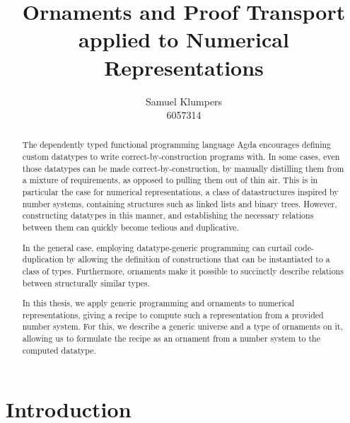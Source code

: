 \documentclass[10pt]{article}
\title{Ornaments and Proof Transport applied to Numerical Representations}
\author{Samuel Klumpers\\6057314}
\theoremstyle{plain}
\theoremstyle{definition}
\begin{document}
\maketitle

\begin{abstract}
The dependently typed functional programming language Agda encourages defining custom datatypes to write correct-by-construction programs with. In some cases, even those datatypes can be made correct-by-construction, by manually distilling them from a mixture of requirements, as opposed to pulling them out of thin air. This is in particular the case for numerical representations, a class of datastructures inspired by number systems, containing structures such as linked lists and binary trees. However, constructing datatypes in this manner, and establishing the necessary relations between them can quickly become tedious and duplicative.

In the general case, employing datatype-generic programming can curtail code-duplication by allowing the definition of constructions that can be instantiated to a class of types. Furthermore, ornaments make it possible to succinctly describe relations between structurally similar types.

In this thesis, we apply generic programming and ornaments to numerical representations, giving a recipe to compute such a representation from a provided number system.
For this, we describe a generic universe and a type of ornaments on it, allowing us to formulate the recipe as an ornament from a number system to the computed datatype.
\end{abstract}


\begin{comment}
This thesis explains the concepts numerical representations and ornaments, and aims to combine these to simplify the presentation and verification of finger trees. We demonstrate the generalizability and easier verification of the resulting code. Further, we also investigate to which extent descriptions and ornaments, and generic programs built on top of these, remain effective in a setting without axiom K.
\end{comment}
    

\tableofcontents

\listoftodos

\section{Introduction}\label{sec:introduction}
%

\end{document}
